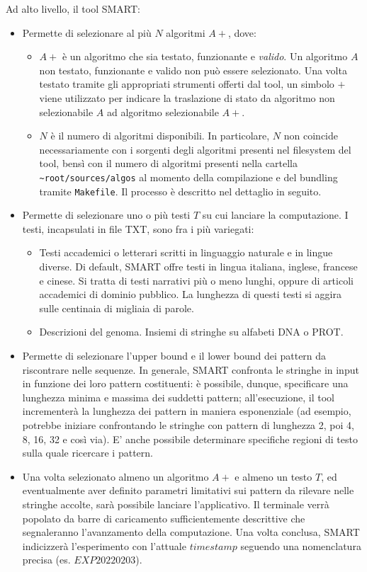 Ad alto livello, il tool SMART:

\begin{itemize}
    \item Permette di selezionare al più $N$ algoritmi $A+$, dove:
    \begin{itemize}
        \item $A+$ è un algoritmo che sia testato, funzionante e \textit{valido}. Un algoritmo $A$ non testato, funzionante e valido non può essere selezionato. Una volta testato tramite gli appropriati strumenti offerti dal tool, un simbolo $+$ viene utilizzato per indicare la traslazione di stato da algoritmo non selezionabile $A$ ad algoritmo selezionabile $A+$.
        \item $N$ è il numero di algoritmi disponibili. In particolare, $N$ non coincide necessariamente con i sorgenti degli algoritmi presenti nel filesystem del tool, bensì con il numero di algoritmi presenti nella cartella \verb|~root/sources/algos| al momento della compilazione e del bundling tramite \verb|Makefile|. Il processo è descritto nel dettaglio in seguito.
    \end{itemize}
    \item Permette di selezionare uno o più testi $T$ su cui lanciare la computazione. I testi, incapsulati in file TXT, sono fra i più variegati:
    \begin{itemize}
        \item Testi accademici o letterari scritti in linguaggio naturale e in lingue diverse. Di default, SMART offre testi in lingua italiana, inglese, francese e cinese. Si tratta di testi narrativi più o meno lunghi, oppure di articoli accademici di dominio pubblico. La lunghezza di questi testi si aggira sulle centinaia di migliaia di parole.
        \item Descrizioni del genoma. Insiemi di stringhe su alfabeti DNA o PROT. 
    \end{itemize}
    \item Permette di selezionare l'upper bound e il lower bound dei pattern da riscontrare nelle sequenze. In generale, SMART confronta le stringhe in input in funzione dei loro pattern costituenti: è possibile, dunque, specificare una lunghezza minima e massima dei suddetti pattern; all'esecuzione, il tool incrementerà la lunghezza dei pattern in maniera esponenziale (ad esempio, potrebbe iniziare confrontando le stringhe con pattern di lunghezza 2, poi 4, 8, 16, 32 e così via). E' anche possibile determinare specifiche regioni di testo sulla quale ricercare i pattern.
    \item Una volta selezionato almeno un algoritmo $A+$ e almeno un testo $T$, ed eventualmente aver definito parametri limitativi sui pattern da rilevare nelle stringhe accolte, sarà possibile lanciare l'applicativo. Il terminale verrà popolato da barre di caricamento sufficientemente descrittive che segnaleranno l'avanzamento della computazione. Una volta conclusa, SMART indicizzerà l'esperimento con l'attuale $timestamp$ seguendo una nomenclatura precisa (es. $EXP20220203$). 
    

\end{itemize}
